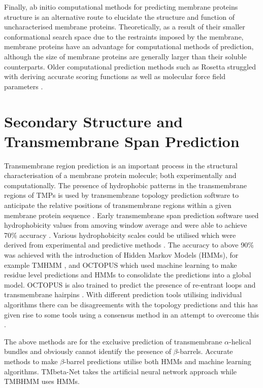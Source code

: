 Finally, ab initio computational methods for predicting membrane proteins structure is an alternative route to elucidate the structure and function of uncharacterised membrane proteins.  Theoretically, as a result of their smaller conformational search space due to the restraints imposed by the membrane, membrane proteins have an advantage for computational methods of prediction, although the size of membrane proteins are generally larger than their soluble counterparts. Older computational prediction methods such as Rosetta \cite{baker2001protein} struggled with deriving accurate scoring functions as well as molecular force field parameters \cite{koehler2015computational}.  

\section{Secondary Structure and Transmembrane Span Prediction}
Transmembrane region prediction is an important process in the structural characterisation of a membrane protein molecule; both experimentally and computationally.  The presence of hydrophobic patterns in the transmembrane regions of TMPs is used by transmembrane topology prediction software to anticipate the relative positions of transmembrane regions within a given membrane protein sequence \cite{krogh2001predicting}.  Early transmembrane span prediction software used hydrophobicity values from amoving window average and were able to achieve 70\% accuracy \cite{koehler2009unified}.  Various hydrophobicity scales could be utilised which were derived from experimental and predictive methods \cite{koehler2009unified}.  The accuracy to above 90\% was achieved with the introduction of Hidden Markov Models (HMMs), for example TMHMM \cite{krogh2001predicting}, and OCTOPUS which used machine learning to make residue level predictions and HMMs to consolidate the predictions into a global model. OCTOPUS is also trained to predict the presence of re-entrant loops and transmembrane hairpins \cite{viklund2006structural}. With different prediction tools utilising individual algorithms there can be disagreements with the topology predictions and this has given rise to some tools using a consensus method in an attempt to overcome this \cite{Tsirigos2015}. 

The above methods are for the exclusive prediction of transmembrane $\alpha$-helical bundles and obviously cannot identify the presence of $\beta$-barrels. Accurate methods to make $\beta$-barrel predictions utilise both HMMs and machine learning algorithms.  TMbeta-Net \cite{gromiha2005tmbeta} takes the artificial neural network approach while TMBHMM \cite{singh2011tmbhmm} uses HMMs.

